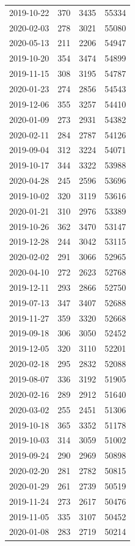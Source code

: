 \begin{tabular}{lrrr}
2019-10-22 & 370 & 3435 & 55334 \\
2020-02-03 & 278 & 3021 & 55080 \\
2020-05-13 & 211 & 2206 & 54947 \\
2019-10-20 & 354 & 3474 & 54899 \\
2019-11-15 & 308 & 3195 & 54787 \\
2020-01-23 & 274 & 2856 & 54543 \\
2019-12-06 & 355 & 3257 & 54410 \\
2020-01-09 & 273 & 2931 & 54382 \\
2020-02-11 & 284 & 2787 & 54126 \\
2019-09-04 & 312 & 3224 & 54071 \\
2019-10-17 & 344 & 3322 & 53988 \\
2020-04-28 & 245 & 2596 & 53696 \\
2019-10-02 & 320 & 3119 & 53616 \\
2020-01-21 & 310 & 2976 & 53389 \\
2019-10-26 & 362 & 3470 & 53147 \\
2019-12-28 & 244 & 3042 & 53115 \\
2020-02-02 & 291 & 3066 & 52965 \\
2020-04-10 & 272 & 2623 & 52768 \\
2019-12-11 & 293 & 2866 & 52750 \\
2019-07-13 & 347 & 3407 & 52688 \\
2019-11-27 & 359 & 3320 & 52668 \\
2019-09-18 & 306 & 3050 & 52452 \\
2019-12-05 & 320 & 3110 & 52201 \\
2020-02-18 & 295 & 2832 & 52088 \\
2019-08-07 & 336 & 3192 & 51905 \\
2020-02-16 & 289 & 2912 & 51640 \\
2020-03-02 & 255 & 2451 & 51306 \\
2019-10-18 & 365 & 3352 & 51178 \\
2019-10-03 & 314 & 3059 & 51002 \\
2019-09-24 & 290 & 2969 & 50898 \\
2020-02-20 & 281 & 2782 & 50815 \\
2020-01-29 & 261 & 2739 & 50519 \\
2019-11-24 & 273 & 2617 & 50476 \\
2019-11-05 & 335 & 3107 & 50452 \\
2020-01-08 & 283 & 2719 & 50214 \\

\end{tabular}
